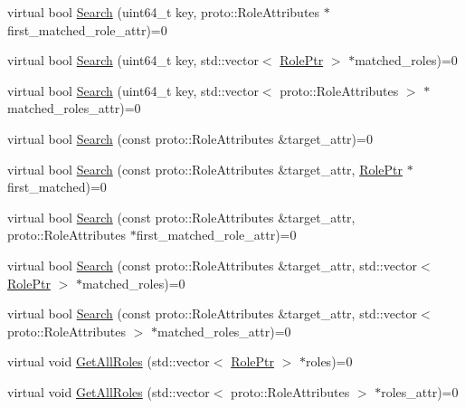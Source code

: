 \begin{DoxyCompactItemize}
\item 
virtual bool \hyperlink{classapollo_1_1cyber_1_1service__discovery_1_1WarehouseBase_aa6b471913855b73127521857a4b2dde5}{Search} (uint64\-\_\-t key, proto\-::\-Role\-Attributes $\ast$first\-\_\-matched\-\_\-role\-\_\-attr)=0
\item 
virtual bool \hyperlink{classapollo_1_1cyber_1_1service__discovery_1_1WarehouseBase_a6d5bf47e2d4a438851f7b56c8ecff8c0}{Search} (uint64\-\_\-t key, std\-::vector$<$ \hyperlink{namespaceapollo_1_1cyber_1_1service__discovery_a47c65bbb4b41d9ae41bfbd33271df525}{Role\-Ptr} $>$ $\ast$matched\-\_\-roles)=0
\item 
virtual bool \hyperlink{classapollo_1_1cyber_1_1service__discovery_1_1WarehouseBase_aad706abb3dfb23ff1c5d10e88fa91940}{Search} (uint64\-\_\-t key, std\-::vector$<$ proto\-::\-Role\-Attributes $>$ $\ast$matched\-\_\-roles\-\_\-attr)=0
\item 
virtual bool \hyperlink{classapollo_1_1cyber_1_1service__discovery_1_1WarehouseBase_a634b5bca3df82e1e86720a36b0bb6acc}{Search} (const proto\-::\-Role\-Attributes \&target\-\_\-attr)=0
\item 
virtual bool \hyperlink{classapollo_1_1cyber_1_1service__discovery_1_1WarehouseBase_a9735a6a80026cd83aa140885ece16233}{Search} (const proto\-::\-Role\-Attributes \&target\-\_\-attr, \hyperlink{namespaceapollo_1_1cyber_1_1service__discovery_a47c65bbb4b41d9ae41bfbd33271df525}{Role\-Ptr} $\ast$first\-\_\-matched)=0
\item 
virtual bool \hyperlink{classapollo_1_1cyber_1_1service__discovery_1_1WarehouseBase_a6911eb3141b838250dd281a321a690de}{Search} (const proto\-::\-Role\-Attributes \&target\-\_\-attr, proto\-::\-Role\-Attributes $\ast$first\-\_\-matched\-\_\-role\-\_\-attr)=0
\item 
virtual bool \hyperlink{classapollo_1_1cyber_1_1service__discovery_1_1WarehouseBase_a5ad083b13db1921e613a2c6303d0881f}{Search} (const proto\-::\-Role\-Attributes \&target\-\_\-attr, std\-::vector$<$ \hyperlink{namespaceapollo_1_1cyber_1_1service__discovery_a47c65bbb4b41d9ae41bfbd33271df525}{Role\-Ptr} $>$ $\ast$matched\-\_\-roles)=0
\item 
virtual bool \hyperlink{classapollo_1_1cyber_1_1service__discovery_1_1WarehouseBase_a06a4eeebfafee845cac5b19a72d2590a}{Search} (const proto\-::\-Role\-Attributes \&target\-\_\-attr, std\-::vector$<$ proto\-::\-Role\-Attributes $>$ $\ast$matched\-\_\-roles\-\_\-attr)=0
\item 
virtual void \hyperlink{classapollo_1_1cyber_1_1service__discovery_1_1WarehouseBase_a7c1565f4a852da30e331d6354b369ebb}{Get\-All\-Roles} (std\-::vector$<$ \hyperlink{namespaceapollo_1_1cyber_1_1service__discovery_a47c65bbb4b41d9ae41bfbd33271df525}{Role\-Ptr} $>$ $\ast$roles)=0
\item 
virtual void \hyperlink{classapollo_1_1cyber_1_1service__discovery_1_1WarehouseBase_a95343b4852d3913c9764f41f0be0fb9e}{Get\-All\-Roles} (std\-::vector$<$ proto\-::\-Role\-Attributes $>$ $\ast$roles\-\_\-attr)=0
\end{DoxyCompactItemize}


